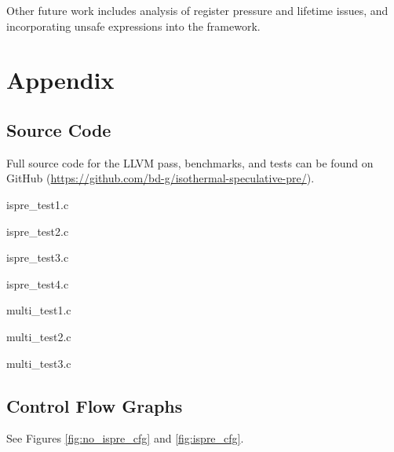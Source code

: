 \documentclass[sigplan,screen]{acmart}
\begin{document}
 Other future work includes analysis of register pressure and lifetime issues, and incorporating unsafe expressions into the framework.

\clearpage

 

 \section{Appendix}
	\label{sec:appendix}

 \subsection{Source Code}
 \label{app:code}

 Full source code for the LLVM pass, benchmarks, and tests can be found on GitHub (\url{https://github.com/bd-g/isothermal-speculative-pre/}).


{ispre_test1.c}


{ispre_test2.c}


{ispre_test3.c}


{ispre_test4.c}


{multi_test1.c}


{multi_test2.c}


{multi_test3.c}

\subsection{Control Flow Graphs}

See Figures \ref{fig:no_ispre_cfg} and \ref{fig:ispre_cfg}.
\end{document}
